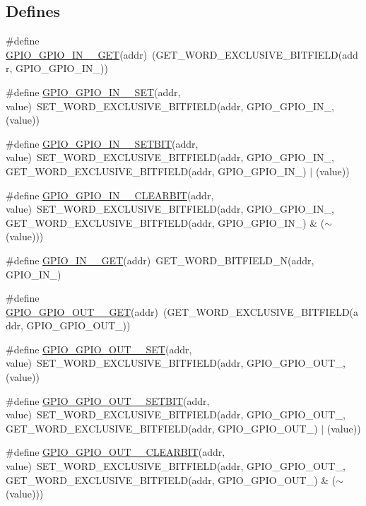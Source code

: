 \subsection*{Defines}
\begin{DoxyCompactItemize}
\item 
\#define \hyperlink{a00554_ab2ef525010bec3855ae5086c921bc1c9}{GPIO\_\-GPIO\_\-IN\_\_\-GET}(addr)~(GET\_\-WORD\_\-EXCLUSIVE\_\-BITFIELD(addr, GPIO\_\-GPIO\_\-IN\_))
\item 
\#define \hyperlink{a00554_a7b1e086dac0b644517863b7c9cc4a283}{GPIO\_\-GPIO\_\-IN\_\_\-SET}(addr, value)~SET\_\-WORD\_\-EXCLUSIVE\_\-BITFIELD(addr, GPIO\_\-GPIO\_\-IN\_, (value))
\item 
\#define \hyperlink{a00554_a49f28ee468d0c7a03e524696173795b3}{GPIO\_\-GPIO\_\-IN\_\_\-SETBIT}(addr, value)~SET\_\-WORD\_\-EXCLUSIVE\_\-BITFIELD(addr, GPIO\_\-GPIO\_\-IN\_, GET\_\-WORD\_\-EXCLUSIVE\_\-BITFIELD(addr, GPIO\_\-GPIO\_\-IN\_) $|$ (value))
\item 
\#define \hyperlink{a00554_aa4d04a6e05db7d40d692a0bd419469e9}{GPIO\_\-GPIO\_\-IN\_\_\-CLEARBIT}(addr, value)~SET\_\-WORD\_\-EXCLUSIVE\_\-BITFIELD(addr, GPIO\_\-GPIO\_\-IN\_, GET\_\-WORD\_\-EXCLUSIVE\_\-BITFIELD(addr, GPIO\_\-GPIO\_\-IN\_) \& ($\sim$(value)))
\item 
\#define \hyperlink{a00554_acc2a30fc37e378397c3080956af55718}{GPIO\_\-IN\_\_\-GET}(addr)~GET\_\-WORD\_\-BITFIELD\_\-N(addr, GPIO\_\-IN\_)
\item 
\#define \hyperlink{a00554_a69e192d16090976e4f51874221bb64ae}{GPIO\_\-GPIO\_\-OUT\_\_\-GET}(addr)~(GET\_\-WORD\_\-EXCLUSIVE\_\-BITFIELD(addr, GPIO\_\-GPIO\_\-OUT\_))
\item 
\#define \hyperlink{a00554_a1648f632532f5638f4bd5611cee4396f}{GPIO\_\-GPIO\_\-OUT\_\_\-SET}(addr, value)~SET\_\-WORD\_\-EXCLUSIVE\_\-BITFIELD(addr, GPIO\_\-GPIO\_\-OUT\_, (value))
\item 
\#define \hyperlink{a00554_a3f22ab0604b8d2366e684d3c838538e6}{GPIO\_\-GPIO\_\-OUT\_\_\-SETBIT}(addr, value)~SET\_\-WORD\_\-EXCLUSIVE\_\-BITFIELD(addr, GPIO\_\-GPIO\_\-OUT\_, GET\_\-WORD\_\-EXCLUSIVE\_\-BITFIELD(addr, GPIO\_\-GPIO\_\-OUT\_) $|$ (value))
\item 
\#define \hyperlink{a00554_a5eaa316cd530f51f0bc666255df86588}{GPIO\_\-GPIO\_\-OUT\_\_\-CLEARBIT}(addr, value)~SET\_\-WORD\_\-EXCLUSIVE\_\-BITFIELD(addr, GPIO\_\-GPIO\_\-OUT\_, GET\_\-WORD\_\-EXCLUSIVE\_\-BITFIELD(addr, GPIO\_\-GPIO\_\-OUT\_) \& ($\sim$(value)))
\item 

\end{DoxyCompactItemize}
